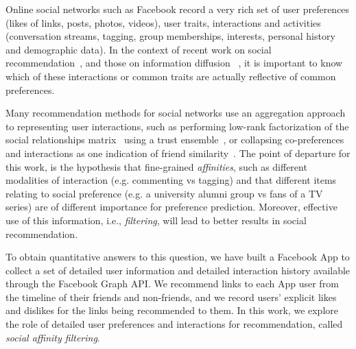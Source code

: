 
\label{sec:introduction}

Online social networks such as Facebook record a very rich set of user
preferences  (likes of links, posts, photos, videos), user traits,
interactions and activities (conversation streams, tagging, group memberships,
interests, personal history and demographic data).  In the context of
 recent work on social recommendation~\cite{sorec,ste,lla}, and those on 
information diffusion %
~\cite{Goel2012structure,Romero2011hashtag,Bakshy2012chamber}, 
it is important to know which of these interactions or common traits
are actually reflective of common preferences.

Many recommendation methods for social networks 
use an aggregation approach to representing  
user interactions, such as performing 
low-rank factorization of the social relationships matrix~\cite{sorec} 
using a trust ensemble~\cite{ste},
or collapsing co-preferences and interactions as 
one indication of friend similarity~\cite{Noel2012NOF}.
The point of departure for this work, is the hypothesis that
fine-grained {\em affinities}, such as
different modalities of interaction (e.g. commenting vs tagging) 
and that different items relating to social preference 
(e.g. a university alumni group vs fans of a TV series) 
are of different importance for preference prediction.
Moreover, effective use of this information, i.e., {\em filtering}, 
will lead to better results in social recommendation.

To obtain quantitative answers to this question, 
we have built a Facebook App to collect a set of 
detailed user information and detailed interaction history 
available through the Facebook Graph API. 
We recommend links to each App user from the timeline of their 
friends and non-friends, and we record users' explicit likes 
and dislikes for the links being recommended to them. 
In this work, we explore the role of detailed user preferences 
and interactions for recommendation, called {\em social affinity filtering}.

